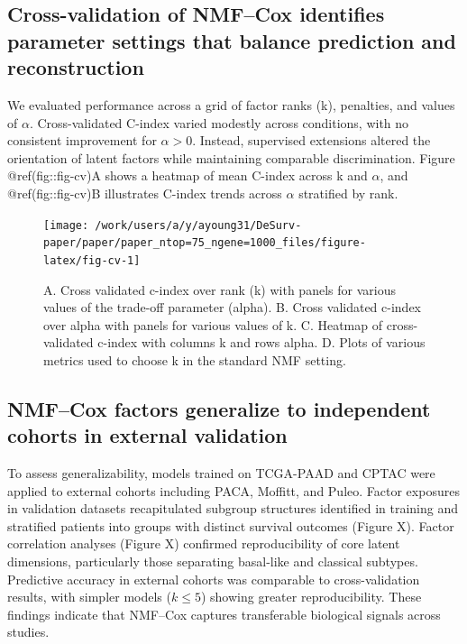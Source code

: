 \documentclass[9pt,twocolumn,twoside,]{pnas-new}
\begin{document}
\subsection{Cross-validation of NMF--Cox identifies parameter settings
that balance prediction and
reconstruction}\label{cross-validation-of-nmfcox-identifies-parameter-settings-that-balance-prediction-and-reconstruction}

We evaluated performance across a grid of factor ranks (k), penalties,
and values of \(\alpha\). Cross-validated C-index varied modestly across
conditions, with no consistent improvement for \(\alpha>0\). Instead,
supervised extensions altered the orientation of latent factors while
maintaining comparable discrimination. Figure @ref(fig::fig-cv)A shows a
heatmap of mean C-index across k and \(\alpha\), and @ref(fig::fig-cv)B
illustrates C-index trends across \(\alpha\) stratified by rank.

\begin{figure}[t]

{\centering \texttt{[image: /work/users/a/y/ayoung31/DeSurv-paper/paper/paper\_ntop=75\_ngene=1000\_files/figure-latex/fig-cv-1]} 

}

\caption{A. Cross validated c-index over rank (k) with panels for various values of the trade-off parameter (alpha). B. Cross validated c-index over alpha with panels for various values of k. C. Heatmap of cross-validated c-index with columns k and rows alpha. D. Plots of various metrics used to choose k in the standard NMF setting.}\label{fig:fig-cv}
\end{figure}

\subsection{NMF--Cox factors generalize to independent cohorts in
external
validation}\label{nmfcox-factors-generalize-to-independent-cohorts-in-external-validation}

To assess generalizability, models trained on TCGA-PAAD and CPTAC were
applied to external cohorts including PACA, Moffitt, and Puleo. Factor
exposures in validation datasets recapitulated subgroup structures
identified in training and stratified patients into groups with distinct
survival outcomes (Figure X). Factor correlation analyses (Figure X)
confirmed reproducibility of core latent dimensions, particularly those
separating basal-like and classical subtypes. Predictive accuracy in
external cohorts was comparable to cross-validation results, with
simpler models (\(k\leq 5\)) showing greater reproducibility. These
findings indicate that NMF--Cox captures transferable biological signals
across studies.
\end{document}
